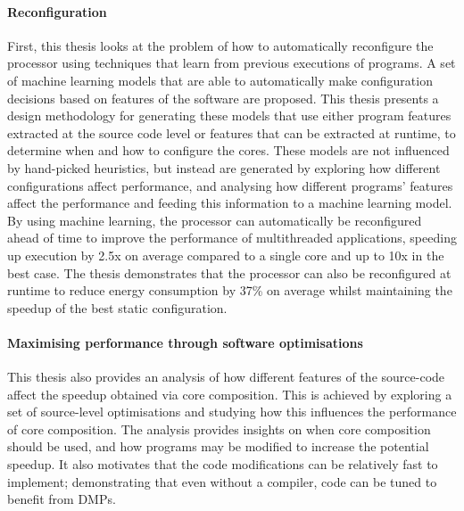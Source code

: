 \paragraph*{Reconfiguration}
First, this thesis looks at the problem of how to automatically reconfigure the processor using techniques that learn from previous executions of programs.
A set of machine learning models that are able to automatically make configuration decisions based on features of the software are proposed.
This thesis presents a design methodology for generating these models that use either program features extracted at the source code level or features that can be extracted at runtime, to determine when and how to configure the cores.
These models are not influenced by hand-picked heuristics, but instead are generated by exploring how different configurations affect performance, and analysing how different programs' features affect the performance and feeding this information to a machine learning model.
By using machine learning, the processor can automatically be reconfigured ahead of time to improve the performance of multithreaded applications, speeding up execution by 2.5x on average compared to a single core and up to 10x in the best case.
The thesis demonstrates that the processor can also be reconfigured at runtime to reduce energy consumption by 37\% on average whilst maintaining the speedup of the best static configuration.

\paragraph*{Maximising performance through software optimisations}
This thesis also provides an analysis of how different features of the source-code affect the speedup obtained via core composition.
This is achieved by exploring a set of source-level optimisations and studying how this influences the performance of core composition.
The analysis provides insights on when core composition should be used, and how programs may be modified to increase the potential speedup.
It also motivates that the code modifications can be relatively  fast to implement; demonstrating that even without a compiler, code can be tuned to benefit from DMPs.

